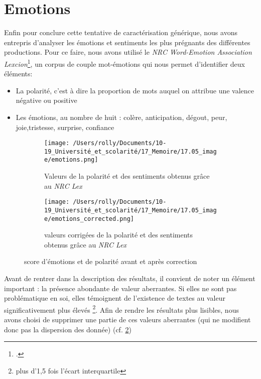 \documentclass[12pt,a4paper,oneside,titlepage]{book} %
\begin{document}
	
	\section{Emotions}
	
	Enfin pour conclure cette tentative de caractérisation générique, nous avons entrepris d'analyser les émotions et sentiments les plus prégnants des différentes productions. Pour ce faire, nous avons utilisé le \emph{NRC Word-Emotion Association Lexcion}\footcite{mohammad_crowdsourcing_2013}, un corpus de couple mot-émotions qui nous permet d'identifier deux éléments: 
	
	 \begin{itemize}
	 	\item La polarité, c'est à dire la proportion de mots auquel on attribue une valence négative ou positive
	 	\item Les émotions, au nombre de huit : colère, anticipation, dégout, peur, joie,tristesse, surprise, confiance
	 \end{itemize}
	 
	 
	 \begin{figure}[htbp]
	 	\centering
	 	\begin{subfigure}[b]{0.45\textwidth}
	 		\texttt{[image: /Users/rolly/Documents/10-19\_Université\_et\_scolarité/17\_Memoire/17.05\_image/emotions.png]}
	 		\caption{Valeurs de la polarité et des sentiments obtenus grâce au \emph{NRC Lex}}
	 		\label{fig:emotions}
	 	\end{subfigure}
	 	\hfill
	 	\begin{subfigure}[b]{0.45\textwidth}
	 		\texttt{[image: /Users/rolly/Documents/10-19\_Université\_et\_scolarité/17\_Memoire/17.05\_image/emotions\_corrected.png]}
	 		\caption{valeurs corrigées de la polarité et des sentiments obtenus grâce au \emph{NRC Lex}}
	 		\label{fig:emotions_corrected}
	 	\end{subfigure}
	 	\caption{score d'émotions et de polarité avant et après correction}
	 	\label{fig:emotions_both}
	 \end{figure}
	 
	 Avant de rentrer dans la description des résultats, il convient de noter un élément important : la présence abondante de valeur aberrantes. Si elles ne sont pas problématique en soi, elles témoignent de l'existence de textes au valeur significativement plus élevés \footnote{plus d'1,5 fois l'écart interquartile}. 
	 Afin de rendre les résultats plus lisibles, nous avons choisi de supprimer une partie de ces valeurs aberrantes (qui ne modifient donc pas la dispersion des donnée) (cf. \ref{fig:emotions_corrected})
\end{document}
